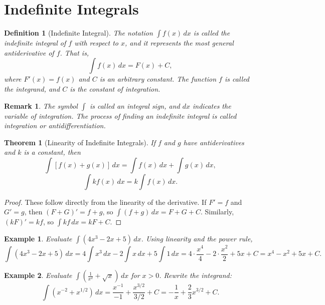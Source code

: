 \documentclass[11pt,a4paper]{article}
\newtheorem{example}{Example}
\newtheorem{theorem}{Theorem}
\newtheorem{definition}{Definition}
\newtheorem{remark}{Remark}
\begin{document}
\section{Indefinite Integrals}
\begin{definition}[Indefinite Integral]
The notation $\int f(x) \, dx$ is called the \textit{indefinite integral} of $f$ with respect to $x$, and it represents the most general antiderivative of $f$. That is,
\[
\int f(x) \, dx = F(x) + C,
\]
where $F'(x) = f(x)$ and $C$ is an arbitrary constant. The function $f$ is called the \textit{integrand}, and $C$ is the \textit{constant of integration}.
\end{definition}
\begin{remark}
The symbol $\int$ is called an integral sign, and $dx$ indicates the variable of integration. The process of finding an indefinite integral is called \textit{integration} or \textit{antidifferentiation}.
\end{remark}
\begin{theorem}[Linearity of Indefinite Integrals]
If $f$ and $g$ have antiderivatives and $k$ is a constant, then
\[
\int [f(x) + g(x)] \, dx = \int f(x) \, dx + \int g(x) \, dx,
\]
\[
\int k f(x) \, dx = k \int f(x) \, dx.
\]
\end{theorem}
\begin{proof}
These follow directly from the linearity of the derivative. If $F' = f$ and $G' = g$, then $(F + G)' = f + g$, so $\int (f+g) \, dx = F + G + C$. Similarly, $(kF)' = kf$, so $\int kf \, dx = kF + C$.
\end{proof}
\begin{example}
Evaluate $\displaystyle \int (4x^3 - 2x + 5) \, dx$.
Using linearity and the power rule,
\[
\int (4x^3 - 2x + 5) \, dx = 4 \int x^3 \, dx - 2 \int x \, dx + 5 \int 1 \, dx = 4 \cdot \frac{x^4}{4} - 2 \cdot \frac{x^2}{2} + 5x + C = x^4 - x^2 + 5x + C.
\]
\end{example}
\begin{example}
Evaluate $\displaystyle \int \left( \frac{1}{x^2} + \sqrt{x} \right) \, dx$ for $x > 0$.
Rewrite the integrand:
\[
\int (x^{-2} + x^{1/2}) \, dx = \frac{x^{-1}}{-1} + \frac{x^{3/2}}{3/2} + C = -\frac{1}{x} + \frac{2}{3}x^{3/2} + C.
\]
\end{example}
\end{document}
